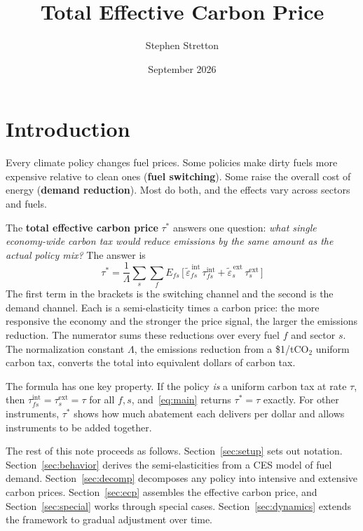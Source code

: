 \documentclass[11pt,a4paper]{article}
\title{Total Effective Carbon Price}
\author{Stephen Stretton}
\date{September 2026}
\begin{document}
\maketitle

\section{Introduction}

Every climate policy changes fuel prices. Some policies make dirty fuels more expensive relative to clean ones (\textbf{fuel switching}). Some raise the overall cost of energy (\textbf{demand reduction}). Most do both, and the effects vary across sectors and fuels.

The \textbf{total effective carbon price} $\tau^*$ answers one question: \emph{what single economy-wide carbon tax would reduce emissions by the same amount as the actual policy mix?} The answer is
\begin{equation}\label{eq:main}
\boxed{\;\tau^{*} = \frac{1}{\Lambda}\sum_{s}\sum_{f} E_{fs}\,\big[\,\tilde{\varepsilon}^{\,\mathrm{int}}_{fs}\,\tau^{\mathrm{int}}_{fs} + \tilde{\varepsilon}^{\,\mathrm{ext}}_{s}\,\tau^{\mathrm{ext}}_{s}\,\big]\;}
\end{equation}
The first term in the brackets is the switching channel and the second is the demand channel. Each is a semi-elasticity times a carbon price: the more responsive the economy and the stronger the price signal, the larger the emissions reduction. The numerator sums these reductions over every fuel $f$ and sector $s$. The normalization constant $\Lambda$, the emissions reduction from a \$1/tCO$_2$ uniform carbon tax, converts the total into equivalent dollars of carbon tax.

The formula has one key property. If the policy \emph{is} a uniform carbon tax at rate $\tau$, then $\tau^{\mathrm{int}}_{fs} = \tau^{\mathrm{ext}}_s = \tau$ for all $f,s$, and~\eqref{eq:main} returns $\tau^* = \tau$ exactly. For other instruments, $\tau^*$ shows how much abatement each delivers per dollar and allows instruments to be added together.

The rest of this note proceeds as follows. Section~\ref{sec:setup} sets out notation. Section~\ref{sec:behavior} derives the semi-elasticities from a CES model of fuel demand. Section~\ref{sec:decomp} decomposes any policy into intensive and extensive carbon prices. Section~\ref{sec:ecp} assembles the effective carbon price, and Section~\ref{sec:special} works through special cases. Section~\ref{sec:dynamics} extends the framework to gradual adjustment over time.
\end{document}
